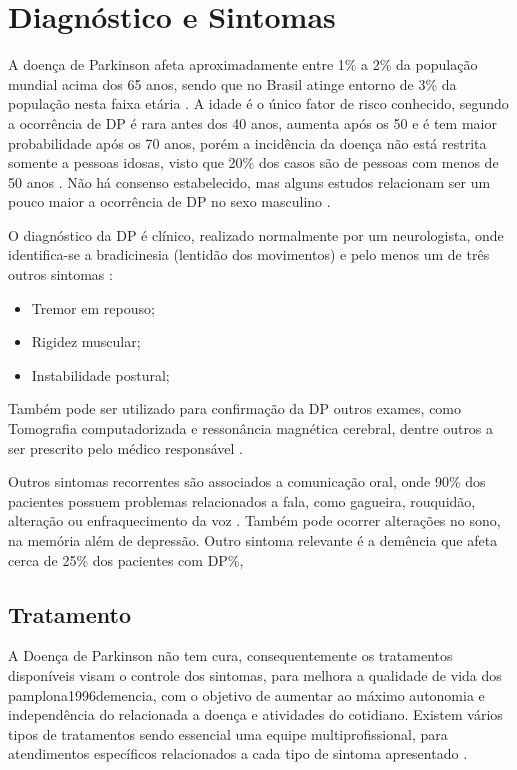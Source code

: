 \section{Diagnóstico e Sintomas}
A doença de Parkinson afeta aproximadamente entre 1\% a 2\% da população mundial acima dos 65 anos, sendo que no Brasil atinge entorno de 3\% da população nesta faixa etária \cite{magalhaes2009descobrindo}. A idade é o único fator de risco conhecido, segundo  a ocorrência de DP é rara antes dos 40 anos, aumenta após os 50 e é tem maior probabilidade após os 70 anos, porém a incidência da doença não está restrita somente a pessoas idosas, visto que 20\% dos casos são de pessoas com menos de 50 anos \cite{gago2014manual}. Não há consenso estabelecido, mas alguns estudos relacionam ser um pouco maior a ocorrência de DP no sexo masculino \cite{peixinho2006alteraccoes}.

O diagnóstico da DP é clínico, realizado normalmente por um neurologista, onde identifica-se a bradicinesia (lentidão dos movimentos) e pelo menos um de três outros sintomas \cite{gago2014manual}:
\begin{itemize}
	\item Tremor em repouso;
	\item Rigidez muscular;
	\item Instabilidade postural;
\end{itemize}

Também pode ser utilizado para confirmação da DP outros exames, como Tomografia computadorizada e ressonância magnética cerebral, dentre outros a ser prescrito pelo médico responsável \cite{gago2014manual}.

Outros sintomas recorrentes são associados a comunicação oral, onde 90\% dos pacientes possuem problemas relacionados a fala, como gagueira, rouquidão, alteração ou enfraquecimento da voz \cite{zarzur2010laryngeal}. Também pode ocorrer alterações no sono, na memória além de depressão\cite{barbosa2005parkinsons}. Outro sintoma relevante é a demência que afeta cerca de 25\% dos pacientes com DP\cite{pamplona1996demencia}\%,

\subsection{Tratamento}
A Doença de Parkinson não tem cura, consequentemente os tratamentos disponíveis visam o controle dos sintomas, para melhora a qualidade de vida dos pamplona1996demencia, com o objetivo de aumentar ao máximo autonomia e independência do relacionada a doença e atividades do cotidiano. Existem vários tipos de tratamentos sendo essencial uma equipe multiprofissional, para atendimentos específicos relacionados a cada tipo de sintoma apresentado \cite{saito2011doencca}.